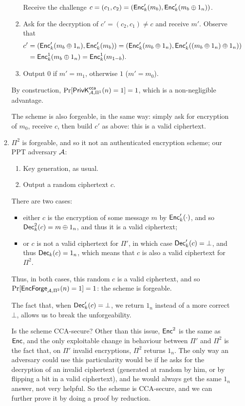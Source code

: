 \begin{solution}
\begin{enumerate}
\begin{enumerate}
\begin{enumerate}
				Receive the challenge $c=(c_1, c_2)=(\Enc'_k(m_b), \Enc'_k(m_b\oplus 1_n))$.
				\item Ask for the decryption of $c'=(c_2, c_1)\neq c$ and receive $m'$. Observe that
				\begin{align*}
					c' &= (\Enc'_k(m_b\oplus 1_n), \Enc'_k(m_b)) = (\Enc'_k(m_b\oplus 1_n), \Enc'_k((m_b\oplus 1_n)\oplus 1_n)) \\
					&= \Enc^1_k(m_b\oplus 1_n) = \Enc^1_k(m_{1-b}).
				\end{align*}
				\item Output $0$ if $m'=m_1$, otherwise $1$ ($m'=m_0$).
			\end{enumerate}
			By construction, $\Pr[\PrivKcca[\A, \Pi^1](n)=1]=1$, which is a non-negligible advantage.

			The scheme is also forgeable, in the same way: simply ask for encryption of $m_0$, receive $c$, then build $c'$ as above: this is a valid ciphertext.

			\item $\Pi^2$ is forgeable, and so it not an authenticated encryption scheme; our PPT adversary $\A$:
			\begin{enumerate}
				\item Key generation, as usual.
				\item Output a random ciphertext $c$.
			\end{enumerate}
			There are two cases:
			\begin{itemize}
				\item either $c$ is the encryption of some message $m$ by $\Enc'_k(\cdot)$, and so $\Dec^2_k(c)=m\oplus 1_n$, and thus it is a valid ciphertext;
				\item or $c$ is not a valid ciphertext for $\Pi'$, in which case $\Dec'_k(c)=\bot$, and thus $\Dec_k(c)=1_n$, which means that $c$ is also a valid ciphertext for $\Pi^2$.
			\end{itemize}
			Thus, in both cases, this random $c$ is a valid ciphertext, and so $\Pr[\EncForge_{\A, \Pi^2}(n)=1]=1$: the scheme is forgeable.

			The fact that, when $\Dec'_k(c)=\bot$, we return $1_n$ instead of a more correct $\bot$, allows us to break the unforgeability.

			Is the scheme CCA-secure?
			Other than this issue, $\Enc^2$ is the same as $\Enc$, and the only exploitable change in behaviour between $\Pi'$ and $\Pi^2$ is the fact that, on $\Pi'$ invalid encryptions, $\Pi^2$ returns $1_n$.
			The only way an adversary could use this particularity would be if he asks for the decryption of an invalid ciphertext (generated at random by him, or by flipping a bit in a valid ciphertext), and he would always get the same $1_n$ answer, not very helpful.
			So the scheme is CCA-secure, and we can further prove it by doing a proof by reduction.
		\end{enumerate}
	\end{enumerate}
\end{solution}



